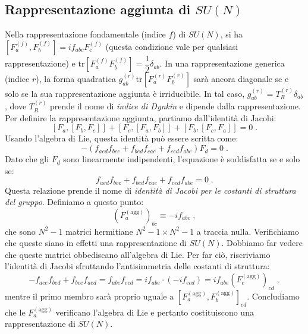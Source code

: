 \documentclass[12pt,a4paper]{article}
\theoremstyle{definition}
\newcommand{\tr}{\mathrm{tr}}
\numberwithin{equation}{section}
\begin{document}
\subsection{Rappresentazione aggiunta di $SU(N)$}
Nella rappresentazione fondamentale (indice $f$) di $SU(N)$, si ha $[F_a^{(f)},F_b^{(f)}]=if_{abc}F_c^{(f)}$ (questa condizione vale per qualsiasi rappresentazione) e $\tr[F_a^{(f)}F_b^{(f)}]=\dfrac{1}{2}\delta_{ab}$. In una rappresentazione generica (indice $r$), la forma quadratica $g^{(r)}_{ab}\tr[F_a^{(r)}F_b^{(r)}]$ sarà ancora diagonale se e solo se la sua rappresentazione aggiunta è irriducibile. In tal caso, $g^{(r)}_{ab}=T_R^{(r)}\delta_{ab}$, dove $T_R^{(r)}$ prende il nome di \emph{indice di Dynkin} e dipende dalla rappresentazione. \\
Per definire la rappresentazione aggiunta, partiamo dall'identità di Jacobi:
\begin{equation}
\left[F_a,[F_b,F_c]\right]+\left[F_c,[F_a,F_b]\right]+\left[F_b,[F_c,F_a]\right]=0\;.
\end{equation}
Usando l'algebra di Lie, questa identità può essere scritta come:
\begin{equation}
-(f_{aed}f_{bce}+f_{bed}f_{cae}+f_{ced}f_{abe})F_d=0\;.
\end{equation}
Dato che gli $F_d$ sono linearmente indipendenti, l'equazione è soddisfatta se e solo se:
\begin{equation}
f_{aed}f_{bce}+f_{bed}f_{cae}+f_{ced}f_{abe}=0\;.
\end{equation}
Questa relazione prende il nome di \emph{identità di Jacobi per le costanti di struttura del gruppo}. Definiamo a questo punto:
\begin{equation}
\left(F^{(\mathrm{agg})}_a\right)_{bc}\equiv -if_{abc}\;,
\end{equation}
che sono $N^2-1$ matrici hermitiane $N^2-1\times N^2-1$ a traccia nulla. Verifichiamo che queste siano in effetti una rappresentazione di $SU(N)$. Dobbiamo far vedere che queste matrici obbediscano all'algebra di Lie. Per far ciò, riscriviamo l'identità di Jacobi sfruttando l'antisimmetria delle costanti di struttura:
$$
-f_{ace}f_{bed}+f_{bce}f_{aed}=f_{abe}f_{ecd}=if_{abe}\cdot(-if_{ecd})=if_{abe}\left(F^{(\mathrm{agg})}_e\right)_{cd}\;,
$$
mentre il primo membro sarà proprio uguale a $[F^{(\mathrm{agg})}_a,F^{(\mathrm{agg})}_b]_{cd}$. Concludiamo che le $F_a^{(\mathrm{agg})}$ verificano l'algebra di Lie e pertanto costituiscono una rappresentazione di $SU(N)$.
\end{document}
